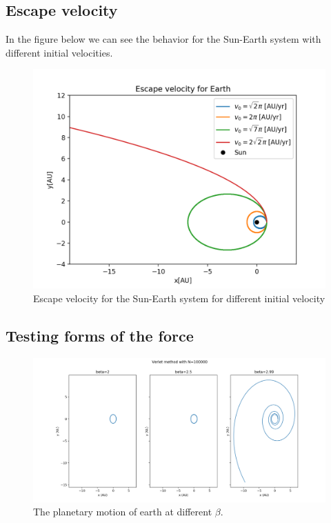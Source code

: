 \documentclass{article}
\begin{document}
\begin{multicols}{2}
\subsection{Escape velocity}
In the figure below we can see the behavior for the Sun-Earth system with different initial velocities. 
\begin{figure}[H]
	\centering
	\includegraphics[width=\linewidth]{esc_vel_plot.png}
	\caption{Escape velocity for the Sun-Earth system for different initial velocity}
	\label{fig:1bplot}
\end{figure}

\subsection{Testing forms of the force}

\begin{figure}[H]
	\centering
	\includegraphics[width=\linewidth]{Force_beta}
	\caption{The planetary motion of earth at different $\beta$.}
	\label{fig:Force_beta}
\end{figure}


\end{multicols}
\end{document}
